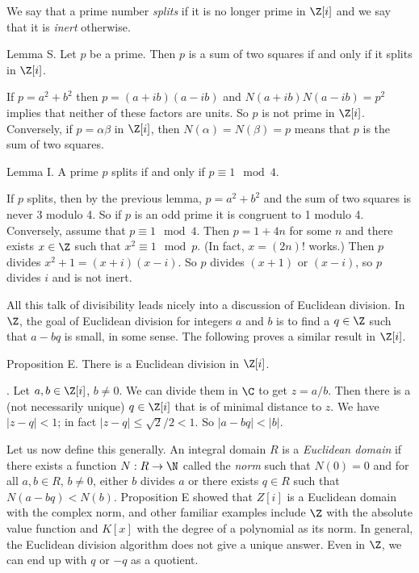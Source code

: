 We say that a prime number {\it splits} if it is no longer prime in $\Z[i]$ and we say that it is {\it inert} otherwise.

\proclaim Lemma S. Let $p$ be a prime. Then $p$ is a sum of two squares if and only if it splits in $\Z[i]$.

\proof If $p = a^2 + b^2$ then $p = (a + ib)(a-ib)$ and $N(a+ib)N(a-ib) = p^2$ implies that neither of these factors are units. So $p$ is not prime in $\Z[i]$. Conversely, if $p = \alpha\beta$ in $\Z[i]$, then $N(\alpha) = N(\beta) = p$ means that $p$ is the sum of two squares.\slug

\proclaim Lemma I. A prime $p$ splits if and only if $p\equiv 1 \mod 4$.

\proof If $p$ splits, then by the previous lemma, $p = a^2 + b^2$ and the sum of two squares is never $3$ modulo 4. So if $p$ is an odd prime it is congruent to 1 modulo 4. Conversely, assume that $p\equiv 1\mod 4$. Then $p = 1 + 4n$ for some $n$ and there exists $x\in \Z$ such that $x^2 \equiv 1\mod p$. (In fact, $x = (2n)!$ works.) Then $p$ divides $x^2 + 1 = (x+i)(x-i)$. So $p$ divides $(x+1)$ or $(x-i)$, so $p$ divides $i$ and is not inert.\slug

All this talk of divisibility leads nicely into a discussion of Euclidean division. In $\Z$, the goal of Euclidean division for integers $a$ and $b$ is to find a $q\in \Z$ such that $a-bq$ is small, in some sense. The following proves a similar result in $\Z[i]$.

\proclaim Proposition E. There is a Euclidean division in $\Z[i]$.

\proof. Let $a,b\in \Z[i]$, $b\neq 0$. We can divide them in $\C$ to get $z = a/b$. Then there is a (not necessarily unique) $q\in \Z[i]$ that is of minimal distance to $z$. We have $|z-q|<1$; in fact $|z-q| \leq \sqrt{2}/2 < 1$. So $|a-bq| < |b|$.\slug

Let us now define this generally. An integral domain $R$ is a {\it Euclidean domain} if there exists a function $N : R\to \N$ called the {\it norm} such that $N(0) = 0$ and for all $a,b\in R$, $b\neq 0$, either $b$ divides $a$ or there exists $q\in R$ such that $N(a-bq) < N(b)$. Proposition E showed that $Z[i]$ is a Euclidean domain with the complex norm, and other familiar examples include $\Z$ with the absolute value function and $K[x]$ with the degree of a polynomial as its norm. In general, the Euclidean division algorithm does not give a unique answer. Even in $\Z$, we can end up with $q$ or $-q$ as a quotient.

